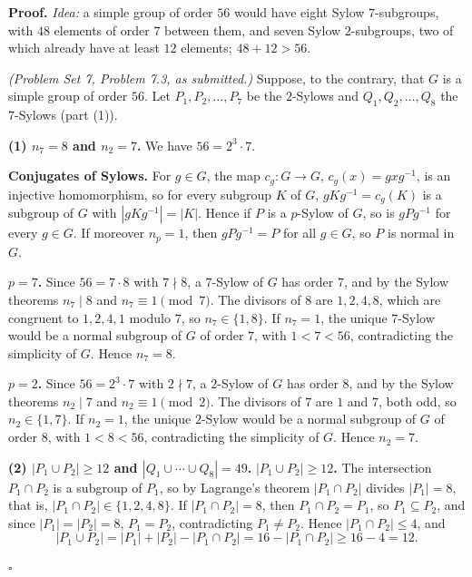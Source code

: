 \documentclass[11pt]{report}
\renewenvironment{proof}[1][Proof]{\noindent\textbf{#1.} }{\hfill$\square$\par\vspace{5pt}}
\begin{document}
\begin{proof}
\textit{Idea:} a simple group of order $56$ would have eight Sylow $7$-subgroups, with $48$ elements of order $7$ between them, and seven Sylow $2$-subgroups, two of which already have at least $12$ elements; $48 + 12 > 56$.\par
\textit{(Problem Set 7, Problem 7.3, as submitted.)} Suppose, to the contrary, that $G$ is a simple group of order $56$. Let $P_1, P_2, \dots, P_7$ be the $2$-Sylows and $Q_1, Q_2, \dots, Q_8$ the $7$-Sylows (part (1)).

\textbf{(1) $n_7 = 8$ and $n_2 = 7$.} We have $56 = 2^3 \cdot 7$.

\textbf{Conjugates of Sylows.} For $g \in G$, the map $c_g \colon G \to G$, $c_g(x) = gxg^{-1}$, is an injective homomorphism, so for every subgroup $K$ of $G$, $gKg^{-1} = c_g(K)$ is a subgroup of $G$ with $|gKg^{-1}| = |K|$. Hence if $P$ is a $p$-Sylow of $G$, so is $gPg^{-1}$ for every $g \in G$. If moreover $n_p = 1$, then $gPg^{-1} = P$ for all $g \in G$, so $P$ is normal in $G$.

\textbf{$p = 7$.} Since $56 = 7 \cdot 8$ with $7 \nmid 8$, a $7$-Sylow of $G$ has order $7$, and by the Sylow theorems $n_7 \mid 8$ and $n_7 \equiv 1 \pmod 7$. The divisors of $8$ are $1, 2, 4, 8$, which are congruent to $1, 2, 4, 1$ modulo $7$, so $n_7 \in \{1, 8\}$. If $n_7 = 1$, the unique $7$-Sylow would be a normal subgroup of $G$ of order $7$, with $1 < 7 < 56$, contradicting the simplicity of $G$. Hence $n_7 = 8$.

\textbf{$p = 2$.} Since $56 = 2^3 \cdot 7$ with $2 \nmid 7$, a $2$-Sylow of $G$ has order $8$, and by the Sylow theorems $n_2 \mid 7$ and $n_2 \equiv 1 \pmod 2$. The divisors of $7$ are $1$ and $7$, both odd, so $n_2 \in \{1, 7\}$. If $n_2 = 1$, the unique $2$-Sylow would be a normal subgroup of $G$ of order $8$, with $1 < 8 < 56$, contradicting the simplicity of $G$. Hence $n_2 = 7$.

\textbf{(2) $|P_1 \cup P_2| \geq 12$ and $|Q_1 \cup \cdots \cup Q_8| = 49$.} \textbf{$|P_1 \cup P_2| \geq 12$.} The intersection $P_1 \cap P_2$ is a subgroup of $P_1$, so by Lagrange's theorem $|P_1 \cap P_2|$ divides $|P_1| = 8$, that is, $|P_1 \cap P_2| \in \{1, 2, 4, 8\}$. If $|P_1 \cap P_2| = 8$, then $P_1 \cap P_2 = P_1$, so $P_1 \subseteq P_2$, and since $|P_1| = |P_2| = 8$, $P_1 = P_2$, contradicting $P_1 \neq P_2$. Hence $|P_1 \cap P_2| \leq 4$, and
\[
|P_1 \cup P_2| = |P_1| + |P_2| - |P_1 \cap P_2| = 16 - |P_1 \cap P_2| \geq 16 - 4 = 12.
\]


\end{proof}
\end{document}
